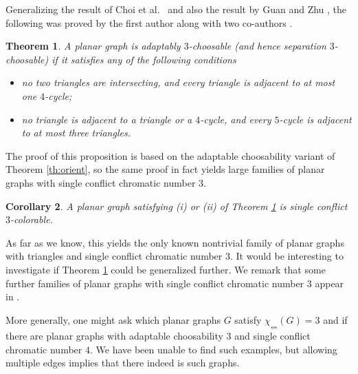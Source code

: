 \documentclass[12pt]{article}
\newtheorem{theorem}{Theorem}[section]
\newtheorem{corollary}[theorem]{Corollary}
\newcommand{\single}{\chi_{\nleftrightarrow}}
\begin{document}
Generalizing the result of Choi et al.\ \cite{Choi} and also the result by 
Guan and Zhu \cite{GuanZhu},
the following was proved by the first author along with two 
co-authors \cite{CasselgrenGranholmRaspaud}. 


\begin{theorem}
\label{prop:cassel}  \cite{CasselgrenGranholmRaspaud}
	A planar graph is adaptably $3$-choosable (and hence separation $3$-choosable)
	if it satisfies any of the following conditions
\begin{itemize}

	\item[(i)] no two triangles are intersecting, and every triangle is adjacent to at most
	one $4$-cycle;

	\item[(ii)] no triangle is adjacent to a triangle or a $4$-cycle, and every $5$-cycle
	is adjacent to at most three triangles.

\end{itemize}

\end{theorem}
The proof of this proposition is based on the adaptable choosability variant
of Theorem \ref{th:orient}, so the same 
proof in fact yields large families of planar graphs with single conflict
chromatic number $3$.

\begin{corollary}
\label{cor:planarsingle}
	A planar graph satisfying (i) or (ii) of Theorem \ref{prop:cassel} is single conflict $3$-colorable.
\end{corollary}


As far as we know, this yields the only known nontrivial 
family of planar graphs with triangles and single conflict
chromatic number $3$. It would be interesting to investigate if Theorem 
\ref{prop:cassel} could be generalized further. We remark
that some further families of planar graphs with single conflict
chromatic number $3$ appear in \cite{CasselgrenGranholmRaspaud}.

More generally, one might ask which planar graphs $G$ satisfy 
$\single(G) = 3$ and if there are planar graphs with adaptable choosability $3$
and single conflict chromatic number $4$. We have been unable to find such examples,
but allowing multiple edges implies that there indeed is such graphs.
\end{document}

